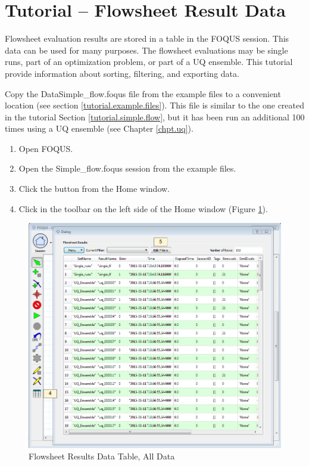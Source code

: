 \section{Tutorial -- Flowsheet Result Data}\label{tutorials.fs.data}

Flowsheet evaluation results are stored in a table in the FOQUS session. This data can be used for many purposes.  The flowsheet evaluations may be single runs, part of an optimization problem, or part of a UQ ensemble. This tutorial provide information about sorting, filtering, and exporting data.

Copy the Data\bs Simple\_flow.foqus file from the example files to a convenient location (see section \ref{tutorial.example.files}).  This file is similar to the one created in the tutorial Section \ref{tutorial.simple.flow}, but it has been run an additional 100 times using a UQ ensemble (see Chapter \ref{chpt.uq}).

\begin{enumerate}
	\item Open FOQUS.
	\item Open the Simple\_flow.foqus session from the example files.
	\item Click the  button from the Home window.
	\item Click  in the toolbar on the left side of the Home window (Figure \ref{fig.data.table1}).
\end{enumerate}

\begin{figure}[H]
	\begin{center}
		\includegraphics[scale=0.55]{Chapt_flowsheet/figs/data_table_1}
		\caption{Flowsheet Results Data Table, All Data}
		\label{fig.data.table1}
	\end{center}
\end{figure}

